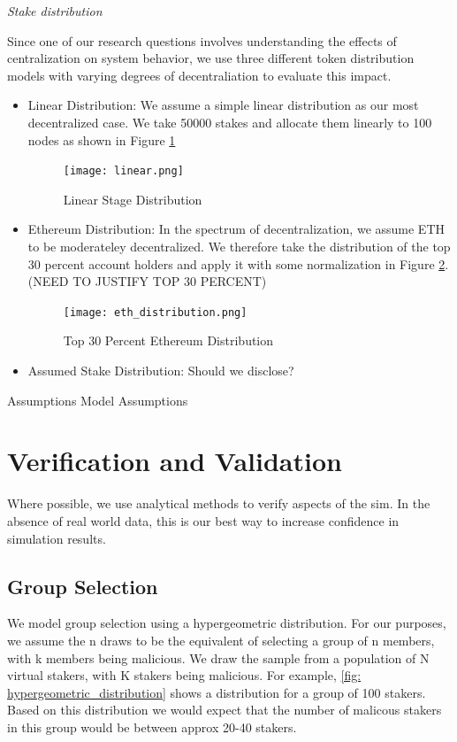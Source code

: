 \documentclass[conference]{IEEEtran}
\begin{document}
\textit{Stake distribution} 

Since one of our research questions involves understanding the effects of centralization
on system behavior, we use three different token distribution models with 
varying degrees of decentraliation to evaluate this impact. 

\begin{itemize}
\item Linear Distribution: We assume a simple linear distribution as our most 
decentralized case. We take 50000 stakes and allocate them linearly to 100 nodes
as shown in Figure \ref{fig:linear_distribution}

\begin{figure}
    \texttt{[image: linear.png]}
    \caption{Linear Stage Distribution}
    \label{fig:linear_distribution}
\end{figure}

\item Ethereum Distribution: In the spectrum of decentralization, we assume 
ETH to be moderateley decentralized. We therefore take the distribution of the 
top 30 percent account holders and apply it with some normalization in Figure \ref{fig:eth_distribution}.
(NEED TO JUSTIFY TOP 30 PERCENT)

\begin{figure}
    \texttt{[image: eth\_distribution.png]}
    \caption{Top 30 Percent Ethereum Distribution}
    \label{fig:eth_distribution}
\end{figure}

\item Assumed Stake Distribution: Should we disclose?
\end{itemize}


Assumptions
Model Assumptions
    
\section{Verification and Validation}
Where possible, we use analytical methods to verify aspects of the sim. In the absence of 
real world data, this is our best way to increase confidence in simulation results.

\subsection{Group Selection}
We model group selection using a hypergeometric distribution. For our purposes, we assume the n draws to 
be the equivalent of selecting a group of n members, with k members being malicious. We draw the sample from
a population of N virtual stakers, with K stakers being malicious. For example, 
\ref{fig: hypergeometric_distribution} shows a distribution for a group of 100 stakers. 
Based on this distribution we would expect that the number of malicous stakers in this group
would be between approx 20-40 stakers.
\end{document}
